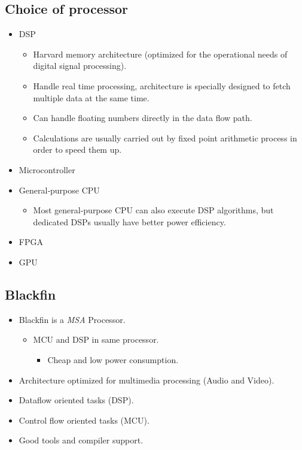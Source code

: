 \subsection{Choice of processor}
\begin{itemize}
	\item DSP
	\begin{itemize}
		\item Harvard memory architecture (optimized for the operational needs of digital signal processing).
		\item Handle real time processing, architecture is specially designed to fetch multiple data at the same time.
		\item Can handle floating numbers directly in the data flow path.
		\item Calculations are usually carried out by fixed point arithmetic process in order to speed them up.
	\end{itemize}
	\item Microcontroller
	\item General‐purpose CPU
	\begin{itemize}
		\item Most general-purpose CPU can also execute DSP algorithms, but dedicated DSPs usually have better power efficiency.
	\end{itemize}
	\item FPGA
	\item GPU
\end{itemize}

\subsection{Blackfin}
\begin{itemize}
	\item Blackfin is a \textit{MSA} Processor.
	\begin{itemize}
		\item MCU and DSP in same processor.
		\begin{itemize}
			\item Cheap and low power consumption.
		\end{itemize}
	\end{itemize}
	\item Architecture optimized for multimedia	processing (Audio and Video).
	\item Dataflow oriented tasks (DSP).
	\item Control flow oriented tasks (MCU).
	\item Good tools and compiler support.
\end{itemize}

